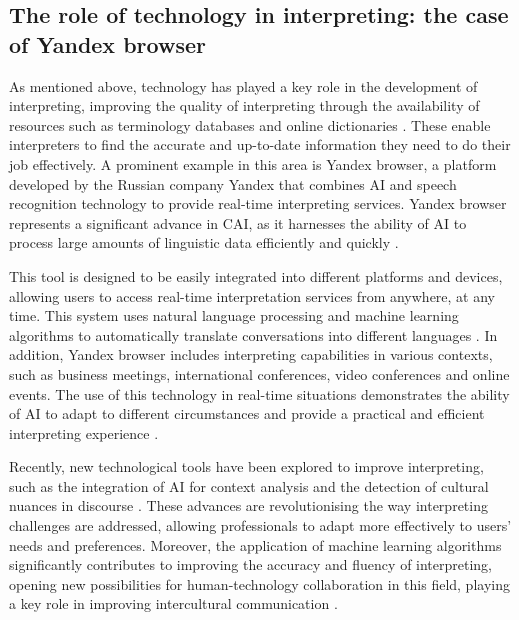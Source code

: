 \subsection{The role of technology in interpreting: the case of Yandex browser}\label{sub-sec-theroleoftechnology}

As mentioned above, technology has played a key role in the development
of interpreting, improving the quality of interpreting through the
availability of resources such as terminology databases and online
dictionaries \cite{CifuentesFerez2015,rockwell2022}. These
enable interpreters to find the accurate and up-to-date information they
need to do their job effectively. A prominent example in this area is
Yandex browser, a platform developed by the Russian company Yandex that
combines AI and speech recognition technology to provide real-time
interpreting services. Yandex browser represents a significant advance
in CAI, as it harnesses the ability of AI to process large amounts of
linguistic data efficiently and quickly \cite{jibreel2023}.

This tool is designed to be easily integrated into different platforms
and devices, allowing users to access real-time interpretation services
from anywhere, at any time. This system uses natural language processing
and machine learning algorithms to automatically translate conversations
into different languages \cite{erbsen2023}. In addition, Yandex
browser includes interpreting capabilities in various contexts, such as
business meetings, international conferences, video conferences and
online events. The use of this technology in real-time situations
demonstrates the ability of AI to adapt to different circumstances and
provide a practical and efficient interpreting experience \cite{novozhilova2020}.

Recently, new technological tools have been explored to improve
interpreting, such as the integration of AI for context analysis and the
detection of cultural nuances in discourse \cite{defrancqfantinuoli2021}. 
These advances are revolutionising the way interpreting
challenges are addressed, allowing professionals to adapt more
effectively to users' needs and preferences. Moreover,
the application of machine learning algorithms significantly contributes
to improving the accuracy and fluency of interpreting, opening new
possibilities for human-technology collaboration in this field, playing
a key role in improving intercultural communication \cite{alotaibi2020}.

